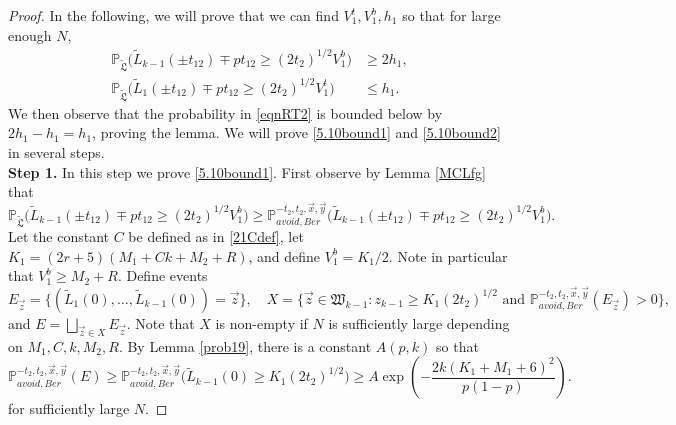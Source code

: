 \begin{proof}
	In the following, we will prove that we can find $V_1^t,V_1^b,h_1$ so that for large enough $N$,
	\begin{align}
	\mathbb{P}_{\tilde{\mathfrak{L}}}\Big(\tilde{L}_{k-1}(\pm t_{12}) \mp pt_{12} \geq (2t_2)^{1/2}V_1^b\Big) &\geq 2h_1, \label{5.10bound1}\\
	\mathbb{P}_{\tilde{\mathfrak{L}}}\Big(\tilde{L}_1(\pm t_{12}) \mp pt_{12} \geq (2t_2)^{1/2}V_1^t\Big) &\leq h_1. \label{5.10bound2}
	\end{align}
	We then observe that the probability in \eqref{eqnRT2} is bounded below by $2h_1 - h_1 = h_1$, proving the lemma. We will prove \eqref{5.10bound1} and \eqref{5.10bound2} in several steps.\\
	
	\noindent\textbf{Step 1.} In this step we prove \eqref{5.10bound1}. First observe by Lemma \ref{MCLfg} that
	\[
	\mathbb{P}_{\tilde{\mathfrak{L}}}\Big(\tilde{L}_{k-1}(\pm t_{12}) \mp pt_{12} \geq (2t_2)^{1/2}V_1^b\Big) \geq \mathbb{P}^{-t_2,t_2,\vec{x},\vec{y}}_{avoid, Ber}\Big(\tilde{L}_{k-1}(\pm t_{12}) \mp pt_{12} \geq (2t_2)^{1/2}V_1^b\Big).
	\]
	Let the constant $C$ be defined as in \eqref{21Cdef}, let $K_1 = (2r+5)(M_1+Ck+M_2+R)$, and define $V_1^b = K_1/2$. Note in particular that $V_1^b \geq M_2+R$. Define events
	\[
	E_{\vec{z}} = \big\{(\tilde{L}_1(0),\dots,\tilde{L}_{k-1}(0)) = \vec{z}\big\}, \quad X = \Big\{ \vec{z}\in\mathfrak{W}_{k-1} : z_{k-1} \geq K_1(2t_2)^{1/2} \mbox { and } \mathbb{P}^{-t_2,t_2,\vec{x},\vec{y}}_{avoid,Ber}(E_{\vec{z}}) > 0\Big\},
	\]
	and $E = \bigsqcup_{\vec{z} \in X} E_{\vec{z}}$. Note that $X$ is non-empty if $N$ is sufficiently large depending on $M_1,C,k,M_2,R$. By Lemma \ref{prob19}, there is a constant $A(p,k)$ so that
	\begin{equation}\label{5.10Ebound}
	\mathbb{P}^{-t_2,t_2,\vec{x},\vec{y}}_{avoid, Ber}(E) \geq \mathbb{P}^{-t_2,t_2,\vec{x},\vec{y}}_{avoid,Ber}\Big(\tilde{L}_{k-1}(0) \geq K_1(2t_2)^{1/2}\Big) \geq A\exp\left(-\frac{2k(K_1+M_1+6)^2}{p(1-p)}\right).
	\end{equation}
	for sufficiently large $N$.
	

\end{proof}
